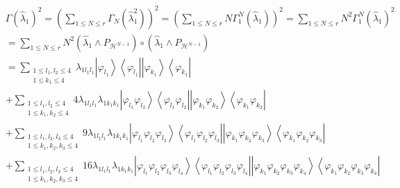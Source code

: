 \documentclass[aps,preprint]{revtex4}%
\begin{document}
\begin{align*}
&  \Gamma\left(  \hat{\lambda}_{1}\right)  ^{2}=\left(  \sum_{1\leq N\leq
r}\Gamma_{N}\left(  \hat{\lambda}_{1}^{2}\right)  \right)  ^{2}=\left(
\sum_{1\leq N\leq r}N\Gamma_{1}^{N}\left(  \hat{\lambda}_{1}\right)  \right)
^{2}=\sum_{1\leq N\leq r}N^{2}\Gamma_{1}^{N}\left(  \hat{\lambda}_{1}\right)
^{2}\\
&  =\sum_{1\leq N\leq r}N^{2}\left(  \hat{\lambda}_{1}\wedge P_{\mathcal{H}%
^{N-1}}\right)  \circ\left(  \hat{\lambda}_{1}\wedge P_{\mathcal{H}^{N-1}%
}\right) \\
&  =\sum_{\substack{1\leq l_{1},l_{2}\leq4\\1\leq k_{1}\leq4}}\lambda
_{1l_{1}l_{1}}\left\vert \varphi_{l_{1}}\right\rangle \left\langle
\varphi_{l_{1}}\right\vert \left\vert \varphi_{k_{1}}\right\rangle
\left\langle \varphi_{k_{1}}\right\vert \\
&  +\sum_{\substack{1\leq l_{1},l_{2}\leq4\\1\leq k_{1},k_{2}\leq4}%
}4\lambda_{1l_{1}l_{1}}\lambda_{1k_{1}k_{1}}\left\vert \varphi_{l_{1}}%
\varphi_{l_{2}}\right\rangle \left\langle \varphi_{l_{1}}\varphi_{l_{2}%
}\right\vert \left\vert \varphi_{k_{1}}\varphi_{k_{2}}\right\rangle
\left\langle \varphi_{k_{1}}\varphi_{k_{2}}\right\vert \\
&  +\sum_{\substack{1\leq l_{1},l_{2},l_{3}\leq4\\1\leq k_{1},k_{2},k_{3}%
\leq4}}9\lambda_{1l_{1}l_{1}}\lambda_{1k_{1}k_{1}}\left\vert \varphi_{l_{1}%
}\varphi_{l_{2}}\varphi_{l_{3}}\right\rangle \left\langle \varphi_{l_{1}%
}\varphi_{l_{2}}\varphi_{l_{3}}\right\vert \left\vert \varphi_{k_{1}}%
\varphi_{k_{2}}\varphi_{k_{3}}\right\rangle \left\langle \varphi_{k_{1}%
}\varphi_{k_{2}}\varphi_{k_{3}}\right\vert \\
&  +\sum_{\substack{1\leq l_{1},l_{2},l_{3}\leq4\\1\leq k_{1},k_{2},k_{3}%
\leq4}}16\lambda_{1l_{1}l_{1}}\lambda_{1k_{1}k_{1}}\left\vert \varphi_{l_{1}%
}\varphi_{l_{2}}\varphi_{l_{3}}\varphi_{l_{4}}\right\rangle \left\langle
\varphi_{l_{1}}\varphi_{l_{2}}\varphi_{l_{3}}\varphi_{l_{4}}\right\vert
\left\vert \varphi_{k_{1}}\varphi_{k_{2}}\varphi_{k_{3}}\varphi_{k_{4}%
}\right\rangle \left\langle \varphi_{k_{1}}\varphi_{k_{2}}\varphi_{k_{3}%
}\varphi_{k_{4}}\right\vert
\end{align*}%
\end{document}
